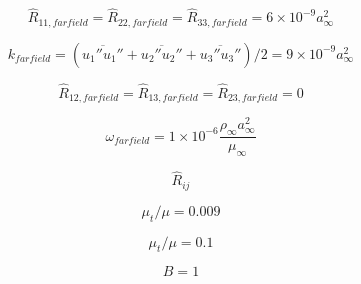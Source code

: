

\begin{equation}
\hat R_{11, farfield} = \hat R_{22, farfield} = \hat R_{33, farfield} = 6 \times 10^{-9} a_{\infty}^2
\end{equation}

\begin{equation}
k_{farfield} = (\overline{u_1''u_1''} + \overline{u_2''u_2''} + \overline{u_3''u_3''})/2
   = 9 \times 10^{-9} a_{\infty}^2
\end{equation}

\begin{equation}
\hat R_{12, farfield} = \hat R_{13, farfield} = \hat R_{23, farfield} = 0
\end{equation}

\begin{equation}
\omega_{farfield} = 1 \times 10^{-6} \frac{\rho_{\infty}a_{\infty}^2}{\mu_{\infty}}
\end{equation}

\begin{equation}
\hat R_{ij}
\end{equation}

\begin{equation}
\mu_t / \mu = 0.009
\end{equation}

\begin{equation}
\mu_t / \mu = 0.1
\end{equation}

\begin{equation}
B=1
\end{equation}


